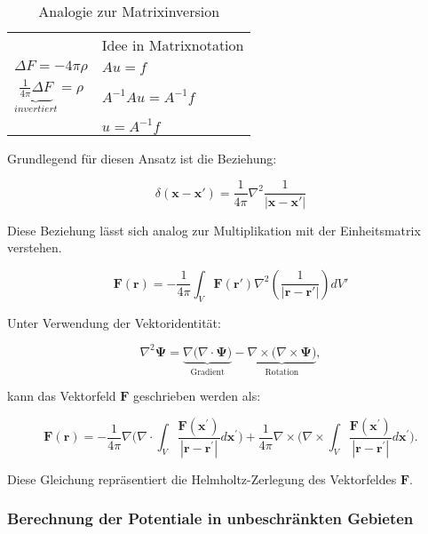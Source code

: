 \begin{table}
\centering
\begin{tabular}{ll}
  & Idee in Matrixnotation \\
$\Delta F = -4 \pi \rho$  & $Au = f$ \\
$\underbrace{\frac{1}{4 \pi} \Delta F}_{invertiert} = \rho$ & $A^{-1}Au = A^{-1}f$  \\
 & $u = A^{-1}f$  \\
\end{tabular}
\caption{Analogie zur Matrixinversion}
\end{table}

Grundlegend für diesen Ansatz ist die Beziehung:

\begin{equation}
\delta (\mathbf{x} - \mathbf{x'}) = \frac{1}{4 \pi} \nabla^2 \frac{1}{|\mathbf{x} - \mathbf{x'}|}
\label{helmholtz:dirac}
\end{equation}

Diese Beziehung lässt sich analog zur Multiplikation mit der Einheitsmatrix verstehen.

\begin{equation}
\mathbf{F}(\mathbf{r}) = -\frac{1}{4\pi} \int_V \mathbf{F}(\mathbf{r}') \nabla^2 \left( \frac{1}{|\mathbf{r} - \mathbf{r}'|} \right) dV'
\end{equation}

Unter Verwendung der Vektoridentität:

\begin{equation}
\nabla^2 \mathbf{\Psi}= \underbrace{\nabla \Big( \nabla \cdot \mathbf{\Psi} \Big)}_{\text{Gradient}} -\underbrace{\nabla \times \Big(\nabla \times \mathbf{\Psi} \Big)}_{\text{Rotation}},
\end{equation}

kann das Vektorfeld $\mathbf{F}$ geschrieben werden als:

\begin{equation}
\mathbf{F}(\mathbf{r}) = - \frac{1}{4 \pi} \nabla \bigg( \nabla \cdot \int_V \frac{\mathbf{F}(\mathbf{x}^{\prime})}{|\mathbf{r} - \mathbf{r}^{\prime}|} d\mathbf{x}^{\prime} \bigg) + \frac{1}{4 \pi} \nabla \times \bigg( \nabla \times \int_V \frac{\mathbf{F}(\mathbf{x}^{\prime})}{|\mathbf{r} - \mathbf{r}^{\prime}|} d\mathbf{x}^{\prime} \bigg).
\end{equation}

\noindent Diese Gleichung repräsentiert die Helmholtz-Zerlegung des Vektorfeldes $\mathbf{F}$.

\subsubsection{Berechnung der Potentiale in unbeschränkten Gebieten}

